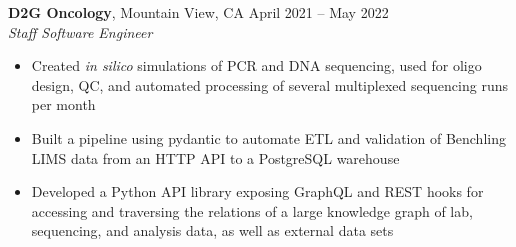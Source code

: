 \documentclass[margin,line]{resume}
\begin{document}
\begin{resume}
    \textbf{D2G Oncology}, Mountain View, CA \hfill\vspace{1mm}\hfill April 2021 -- May 2022\\%
    \textsl{Staff Software Engineer}
    \begin{itemize}
    \item Created \textit{in silico} simulations of PCR and DNA sequencing, used for oligo design, QC, and automated processing of several multiplexed sequencing runs per month
    \item Built a pipeline using pydantic to automate ETL and validation of Benchling LIMS data from an HTTP API to a PostgreSQL warehouse
    \item Developed a Python API library exposing GraphQL and REST hooks for accessing and traversing the relations of a large knowledge graph of lab, sequencing, and analysis data, as well as external data sets
    \end{itemize}


\end{resume}
\end{document}
